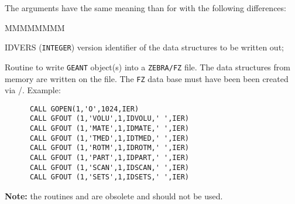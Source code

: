 The arguments have the same meaning than for  with the following
differences:
\begin{DLtt}{MMMMMMMM}
\item[IDVERS] ({\tt INTEGER}) version identifier of the data structures
to be written out;
\end{DLtt}

Routine to write {\tt GEANT} object(s) into a {\tt ZEBRA/FZ} file.
The data structures from memory are written on the file.
The {\tt FZ} data base must have been been created via
/.  Example:

\begin{verbatim}
      CALL GOPEN(1,'O',1024,IER)
      CALL GFOUT (1,'VOLU',1,IDVOLU,' ',IER)
      CALL GFOUT (1,'MATE',1,IDMATE,' ',IER)
      CALL GFOUT (1,'TMED',1,IDTMED,' ',IER)
      CALL GFOUT (1,'ROTM',1,IDROTM,' ',IER)
      CALL GFOUT (1,'PART',1,IDPART,' ',IER)
      CALL GFOUT (1,'SCAN',1,IDSCAN,' ',IER)
      CALL GFOUT (1,'SETS',1,IDSETS,' ',IER)
\end{verbatim}

{\bf Note:} the routines  and  are obsolete and
should not be used.
